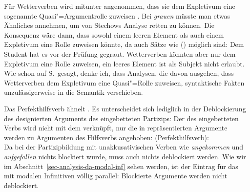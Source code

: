 Für Wetterverben wird mitunter angenommen, dass sie dem Expletivum eine sogenannte
Quasi"=Argumentrolle zuweisen \citep[--327]{Chomsky93a}. Bei \emph{grauen} müsste man
etwas Ähnliches annehmen, um von Stechows Analyse retten zu können. Die Konsequenz wäre dann, dass \grauen
sowohl einem leeren Element als auch einem Expletivum eine Rolle zuweisen könnte,
da auch Sätze wie () möglich sind:
\ea
Dem Student hat es vor der Prüfung gegraut.
\z
Wetterverben könnten aber nur dem Expletivum eine Rolle zuweisen, ein leeres
Element ist als Subjekt nicht erlaubt. Wie schon auf S.\,\pageref{page-syntaktisierung} gesagt,
denke ich, dass Analysen, die davon ausgehen, dass Wetterverben dem Expletivum eine Quasi"=Rolle
zuweisen, syntaktische Fakten unzulässigerweise in die Semantik verschieben. 

Das Perfekthilfsverb \sein ähnelt \haben. Es unterscheidet sich lediglich 
in der Deblockierung des designierten Arguments des eingebetteten Partizips: Der \subjw
des eingebetteten Verbs wird nicht mit dem \compsw verknüpft, nur die in \comps repräsentierten
Argumente  werden zu Argumenten des Hilfsverbs angehoben:
\eas
\label{le-sein-perfekt}%
\mbox{\sein (Perfekthilfsverb):}\\
\zs
Da bei der Partizipbildung mit unakkusativischen Verben wie \emph{angekommen} und \emph{aufgefallen}
nichts blockiert wurde, muss auch nichts deblockiert werden. Wie wir im
Abschnitt~\ref{sec-analysis-da-modal-inf} sehen werden, ist der Eintrag für das \sein mit modalen
Infinitiven völlig parallel: Blockierte Argumente werden nicht deblockiert.


